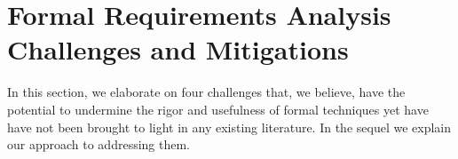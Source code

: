 \section{Formal Requirements Analysis Challenges and Mitigations}
\label{sec:challenge}

In this section, we elaborate on four challenges that, we believe, have the potential to undermine the rigor and usefulness of formal techniques yet have have not been brought to light in any existing literature. In the sequel we explain our approach to addressing them.



